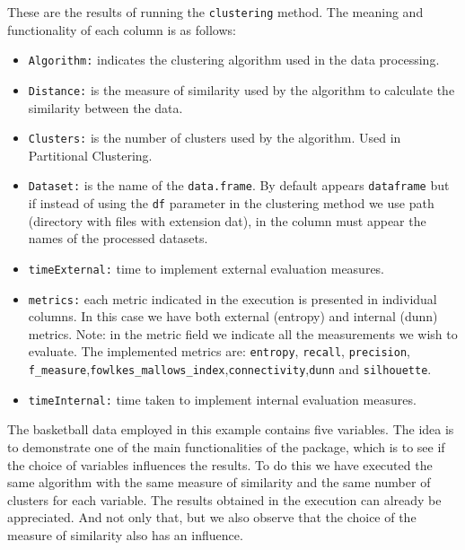 These are the results of running the \texttt{clustering} method. The meaning and functionality of each column is as follows:
\begin{itemize}
  \item \texttt{Algorithm:} indicates the clustering algorithm used in the data processing.
  \item \texttt{Distance:} is the measure of similarity used by the algorithm to calculate the similarity between the data.
  \item \texttt{Clusters:} is the number of clusters used by the algorithm. Used in Partitional Clustering.
  \item \texttt{Dataset:} is the name of the \texttt{data.frame}. By default appears \texttt{dataframe} but if instead of using the \texttt{df} parameter in the clustering method we use path (directory with files with extension dat), in the column must appear the names of the processed datasets.
  \item \texttt{timeExternal:} time to implement external evaluation measures.
  \item \texttt{metrics:} each metric indicated in the execution is presented in individual columns. In this case we have both external (entropy) and internal (dunn) metrics.
  Note: in the metric field we indicate all the measurements we wish to evaluate. The implemented metrics are: \texttt{entropy}, \texttt{recall}, \texttt{precision}, \texttt{f\_measure},\texttt{fowlkes\_mallows\_index},\texttt{connectivity},\texttt{dunn} and \texttt{silhouette}.
  \item \texttt{timeInternal:} time taken to implement internal evaluation measures.\\
\end{itemize}

The basketball data employed in this example contains five variables. The idea is to demonstrate one of the main functionalities of the package, which is to see if the choice of variables influences the results. To do this we have executed the same algorithm with the same measure of similarity and the same number of clusters for each variable. The results obtained in the execution can already be appreciated. And not only that, but we also observe that the choice of the measure of similarity also has an influence.


